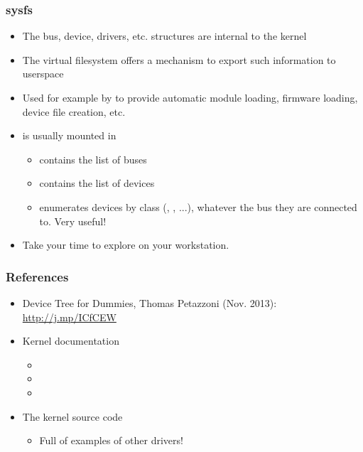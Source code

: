\begin{frame}
  \frametitle{sysfs}
  \begin{itemize}
  \item The bus, device, drivers, etc. structures are internal to the
    kernel
  \item The  virtual filesystem offers a mechanism to
    export such information to userspace
  \item Used for example by  to provide automatic module loading,
    firmware loading, device file creation, etc.
  \item {} is usually mounted in 
    \begin{itemize}
    \item {} contains the list of buses
    \item {} contains the list of devices
    \item {} enumerates devices by class (,
      , ...), whatever the bus they are connected
      to. Very useful!
    \end{itemize}
  \item Take your time to explore  on your workstation.
  \end{itemize}
\end{frame}

\begin{frame}
  \frametitle{References}
  \begin{itemize}
  \item Device Tree for Dummies, Thomas Petazzoni (Nov. 2013):
        \url{http://j.mp/ICfCEW}
  \item Kernel documentation
    \begin{itemize}
    \item {}
    \item {}
    \item {}
    \end{itemize}
  \item The kernel source code
    \begin{itemize}
    \item Full of examples of other drivers!
    \end{itemize}
  \end{itemize}
\end{frame}

